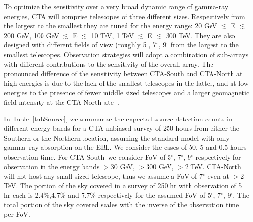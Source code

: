 \documentclass[final,5p]{elsarticle}
\begin{document}
To optimize the sensitivity over a very broad dynamic range of gamma-ray energies, CTA will comprise telescopes of three different sizes. Respectively from the largest to the smallest they are tuned for the energy range: 20 GeV $\lesssim$ E $\lesssim$ 200 GeV, 100 GeV $\lesssim$ E $\lesssim$ 10 TeV, 1 TeV $\lesssim$ E $\lesssim$ 300 TeV. They are also designed with different fields of view (roughly 5$^{\circ}$, 7$^{\circ}$, 9$^{\circ}$ from the largest to the smallest telescopes. Observation strategies will adopt a combination of sub-arrays with different contributions to the sensitivity of the overall array. The pronounced difference of the sensitivity between CTA-South and CTA-North at high energies is due to the lack of the smallest telescopes in the latter, and at low energies to the presence of fewer middle sized telescopes and a larger geomagnetic field intensity at the CTA-North site~\cite{Szanecki2013,Maier2015}.

In Table~\ref{tabSource}, we summarize the expected source detection counts in different energy bands for a CTA unbiased survey of 250 hours from either the Southern or the Northern location, assuming the standard model with only gamma--ray absorption on the EBL. We consider the cases of 50, 5 and 0.5 hours observation time. For CTA-South, we consider FoV of 5$^{\circ}$, 7$^{\circ}$, 9$^{\circ}$ respectively for observation in the energy bands $>30$ GeV, $>300$ GeV, $>2$ TeV. CTA-North will not host any small sized telescope, thus we assume a FoV of 7$^{\circ}$ even at $>2$ TeV. The portion of the sky covered in a survey of 250 hr with observation of 5 hr each is 2.4\%,4.7\% and 7.7\% respectively for the assumed FoV of 5$^{\circ}$, 7$^{\circ}$, 9$^{\circ}$. The total portion of the sky covered scales with the inverse of the observation time per FoV.
\end{document}

